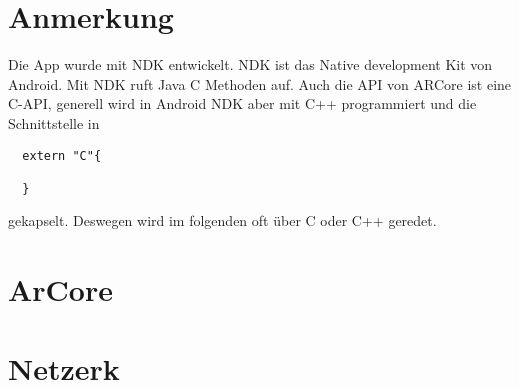 \section{Anmerkung}
Die App wurde mit NDK entwickelt. NDK ist das Native development Kit von Android.
Mit NDK ruft Java C Methoden auf. Auch die API von ARCore ist eine C-API, generell wird in Android NDK aber mit C++ programmiert und die Schnittstelle in
\begin{verbatim}
  extern "C"{

  }
\end{verbatim}
gekapselt. Deswegen wird im folgenden oft über C oder C++ geredet.

\section{ArCore}


\section{Netzerk}


